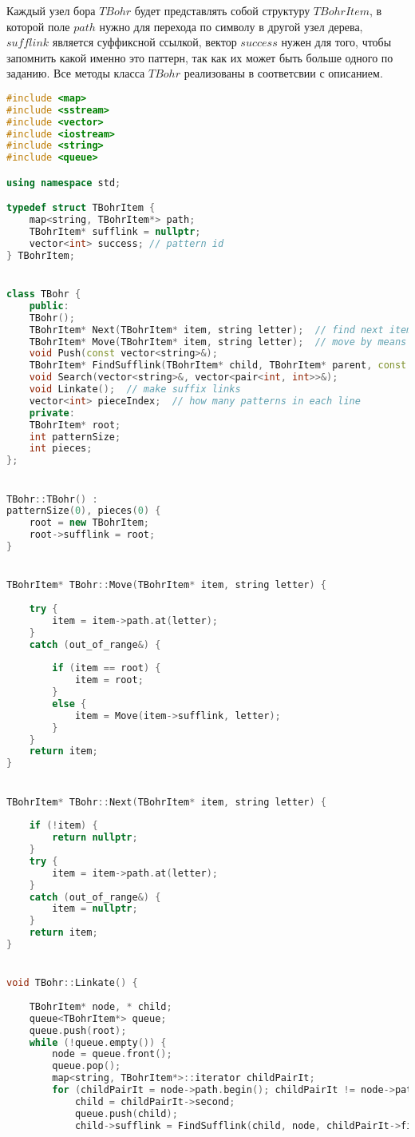 Каждый узел бора $TBohr$ будет представлять собой структуру $TBohrItem$, в которой поле $path$ нужно для перехода по символу
в другой узел дерева, $sufflink$ является суффиксной ссылкой, вектор $success$ нужен для того, чтобы запомнить какой именно
это паттерн, так как их может быть больше одного по заданию. Все методы класса $TBohr$ реализованы в соответсвии с описанием.


\begin{lstlisting}[language=C++]
#include <map>
#include <sstream>
#include <vector>
#include <iostream>
#include <string>
#include <queue>

using namespace std;

typedef struct TBohrItem {
	map<string, TBohrItem*> path;
	TBohrItem* sufflink = nullptr;
	vector<int> success; // pattern id
} TBohrItem;


class TBohr {
	public:
	TBohr();
	TBohrItem* Next(TBohrItem* item, string letter);  // find next item by letter
	TBohrItem* Move(TBohrItem* item, string letter);  // move by means of letter or item's sufflink
	void Push(const vector<string>&);
	TBohrItem* FindSufflink(TBohrItem* child, TBohrItem* parent, const string letter);
	void Search(vector<string>&, vector<pair<int, int>>&);
	void Linkate();  // make suffix links
	vector<int> pieceIndex;  // how many patterns in each line
	private:
	TBohrItem* root;
	int patternSize;
	int pieces;
};


TBohr::TBohr() :
patternSize(0), pieces(0) {
	root = new TBohrItem;
	root->sufflink = root;
}


TBohrItem* TBohr::Move(TBohrItem* item, string letter) {
	
	try {
		item = item->path.at(letter);
	}
	catch (out_of_range&) {
		
		if (item == root) {
			item = root;
		}
		else {
			item = Move(item->sufflink, letter);
		}
	}
	return item;
}


TBohrItem* TBohr::Next(TBohrItem* item, string letter) {
	
	if (!item) {
		return nullptr;
	}
	try {
		item = item->path.at(letter);
	}
	catch (out_of_range&) {
		item = nullptr;
	}
	return item;
}


void TBohr::Linkate() {
	
	TBohrItem* node, * child;
	queue<TBohrItem*> queue;
	queue.push(root);
	while (!queue.empty()) {
		node = queue.front();
		queue.pop();
		map<string, TBohrItem*>::iterator childPairIt;
		for (childPairIt = node->path.begin(); childPairIt != node->path.end(); ++childPairIt) {
			child = childPairIt->second;
			queue.push(child);
			child->sufflink = FindSufflink(child, node, childPairIt->first);
			

\end{lstlisting}

